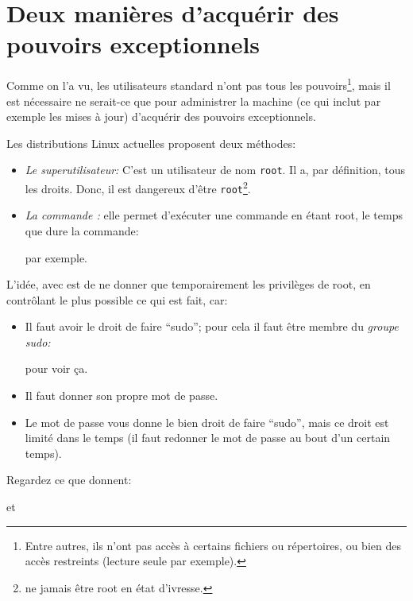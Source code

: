 \section{\textdbend Deux manières d'acquérir des pouvoirs exceptionnels}
Comme on l'a vu, les utilisateurs \og standard\fg{} n'ont pas tous les
pouvoirs\footnote{Entre autres, ils n'ont pas accès à certains
  fichiers ou répertoires, ou bien des accès restreints (lecture seule
  par exemple).}, mais il est nécessaire ne serait-ce que pour administrer la
machine (ce qui inclut par exemple les mises à jour) d'acquérir des
pouvoirs exceptionnels.

Les distributions Linux actuelles proposent deux méthodes:

\begin{itemize}
\item \emph{Le superutilisateur:}
C'est un utilisateur de  nom  \texttt{root}. Il a, par définition, tous les
droits. Donc, il est dangereux d'être \texttt{root}\footnote{ne jamais être
  root en état d'ivresse.}.
\item \emph{La commande :}
  elle permet d'exécuter une commande en étant root, le temps que dure
  la commande: 


  par exemple.
\end{itemize}

L'idée, avec  est de ne donner que temporairement les
privilèges de root, en contrôlant le plus possible ce qui est fait, car:
\begin{itemize}
  \item Il faut avoir le droit de faire ``sudo''; pour cela il faut
    être membre du \emph{groupe sudo:}


    pour voir ça.

  \item Il faut donner son propre mot de passe.

  \item Le mot de passe vous donne le bien droit de faire ``sudo'', mais ce
    droit est limité dans le temps (il faut redonner le mot de passe
    au bout d'un certain temps).
\end{itemize}

Regardez ce que donnent:


et

    

